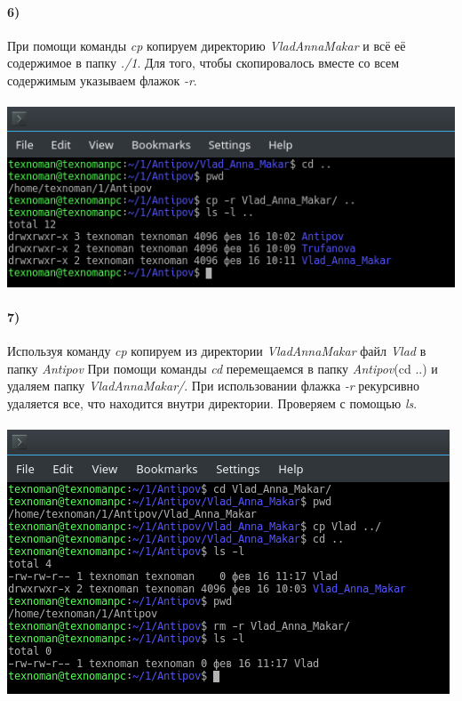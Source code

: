 	\paragraph{6)}
	При помощи команды \textit{cp} копируем директорию \textit{VladAnnaMakar} и всё её содержимое в папку \textit{./1}.
	Для того, чтобы скопировалось вместе со всем содержимым указываем флажок \textit{-r}.\\
	\\
	\includegraphics[width=\textwidth]{6.png}

	\paragraph{7)}
	Используя команду \textit{cp} копируем из директории \textit{VladAnnaMakar} файл \textit{Vlad} в папку \textit{Antipov}
	При помощи команды \textit{cd} перемещаемся в папку \textit{Antipov}(cd ..) и удаляем папку \textit{VladAnnaMakar/}. 
	При использовании флажка \textit{-r} рекурсивно удаляется все, что находится внутри директории. Проверяем с помощью 
	\textit{ls}.\\
	\\
	\includegraphics[width=\textwidth]{7.png}

